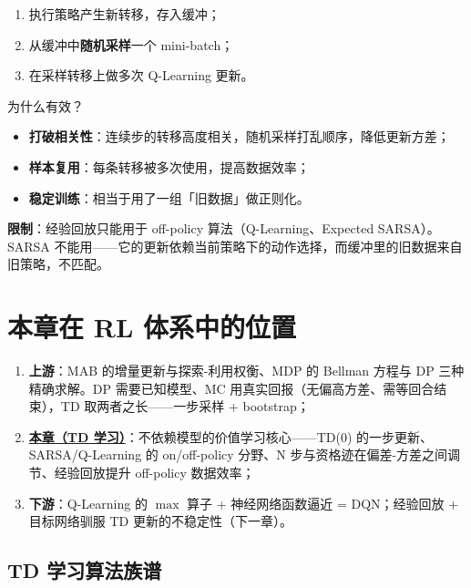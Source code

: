 \documentclass{article}
\begin{document}
\begin{enumerate}
  \item 执行策略产生新转移，存入缓冲；
  \item 从缓冲中\textbf{随机采样}一个 mini-batch；
  \item 在采样转移上做多次 Q-Learning 更新。
\end{enumerate}

为什么有效？
\begin{itemize}
  \item \textbf{打破相关性}：连续步的转移高度相关，随机采样打乱顺序，降低更新方差；
  \item \textbf{样本复用}：每条转移被多次使用，提高数据效率；
  \item \textbf{稳定训练}：相当于用了一组「旧数据」做正则化。
\end{itemize}

\textbf{限制}：经验回放只能用于 off-policy 算法（Q-Learning、Expected SARSA）。SARSA 不能用——它的更新依赖当前策略下的动作选择，而缓冲里的旧数据来自旧策略，不匹配。

\section*{本章在 RL 体系中的位置}

\begin{enumerate}
  \item \textbf{上游}：MAB 的增量更新与探索-利用权衡、MDP 的 Bellman 方程与 DP 三种精确求解。DP 需要已知模型、MC 用真实回报（无偏高方差、需等回合结束），TD 取两者之长——一步采样 + bootstrap；
  \item \underline{\textbf{本章（TD 学习）}}：不依赖模型的价值学习核心——TD(0) 的一步更新、SARSA/Q-Learning 的 on/off-policy 分野、N 步与资格迹在偏差-方差之间调节、经验回放提升 off-policy 数据效率；
  \item \textbf{下游}：Q-Learning 的 $\max$ 算子 + 神经网络函数逼近 = DQN；经验回放 + 目标网络驯服 TD 更新的不稳定性（下一章）。
\end{enumerate}

\subsection*{TD 学习算法族谱}
\end{document}

